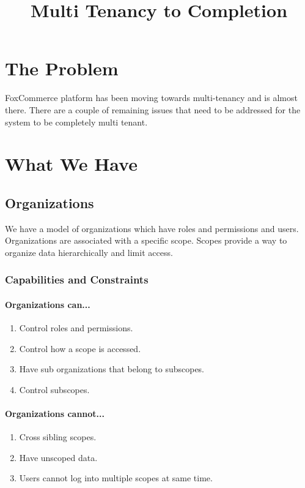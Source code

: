 \documentclass[11pt]{article}
\title{Multi Tenancy to Completion}
\begin{document}
\maketitle
\section{The Problem}

FoxCommerce platform has been moving towards multi-tenancy and is almost there. 
There are a couple of remaining issues that need to be addressed for the system 
to be completely multi tenant. 

\section{What We Have}

\subsection{Organizations}

We have a model of organizations which have roles and permissions and users.
Organizations are associated with a specific scope. Scopes provide a way to
organize data hierarchically and limit access.

\subsubsection{Capabilities and Constraints}

\paragraph{Organizations can...}

\begin{enumerate}
    \item Control roles and permissions.
    \item Control how a scope is accessed.
    \item Have sub organizations that belong to subscopes.
    \item Control subscopes.
\end{enumerate}

\paragraph{Organizations cannot...}

\begin{enumerate}
    \item Cross sibling scopes.
    \item Have unscoped data.
    \item Users cannot log into multiple scopes at same time.
\end{enumerate}
\end{document}
